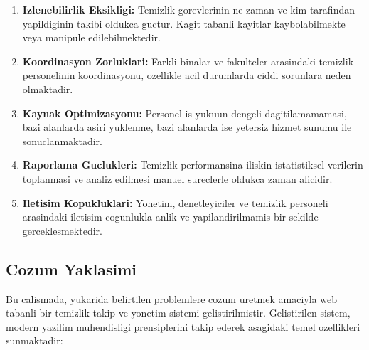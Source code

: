 \begin{enumerate}
    \item \textbf{Izlenebilirlik Eksikligi:} Temizlik gorevlerinin ne zaman 
    ve kim tarafindan yapildiginin takibi oldukca guctur. Kagit tabanli 
    kayitlar kaybolabilmekte veya manipule edilebilmektedir.
    
    \item \textbf{Koordinasyon Zorluklari:} Farkli binalar ve fakulteler 
    arasindaki temizlik personelinin koordinasyonu, ozellikle acil 
    durumlarda ciddi sorunlara neden olmaktadir.
    
    \item \textbf{Kaynak Optimizasyonu:} Personel is yukuun dengeli 
    dagitilamamamasi, bazi alanlarda asiri yuklenme, bazi alanlarda ise 
    yetersiz hizmet sunumu ile sonuclanmaktadir.
    
    \item \textbf{Raporlama Guclukleri:} Temizlik performansina iliskin 
    istatistiksel verilerin toplanmasi ve analiz edilmesi manuel 
    sureclerle oldukca zaman alicidir.
    
    \item \textbf{Iletisim Kopukluklari:} Yonetim, denetleyiciler ve 
    temizlik personeli arasindaki iletisim cogunlukla anlik ve 
    yapilandirilmamis bir sekilde gerceklesmektedir.
\end{enumerate}

\subsection{Cozum Yaklasimi}
\label{subsec:cozum-yaklasimi}

Bu calismada, yukarida belirtilen problemlere cozum uretmek amaciyla 
web tabanli bir temizlik takip ve yonetim sistemi gelistirilmistir. 
Gelistirilen sistem, modern yazilim muhendisligi prensiplerini takip 
ederek asagidaki temel ozellikleri sunmaktadir:


